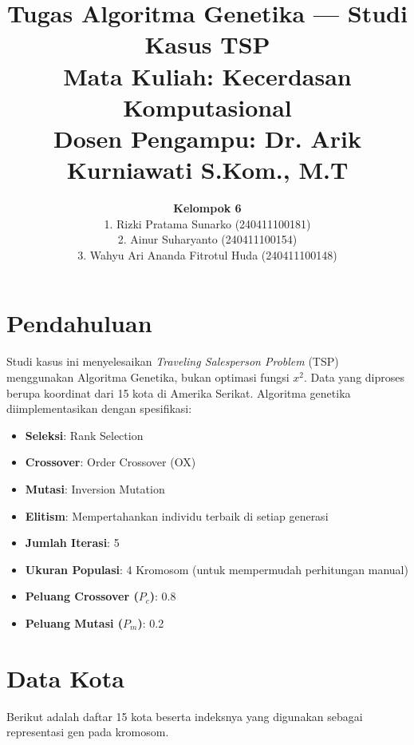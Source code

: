 \documentclass[12pt]{article}
\title{
  \textbf{Tugas Algoritma Genetika --- Studi Kasus TSP} \\
  \vspace{0.5em}
  \large \textbf{Mata Kuliah:} Kecerdasan Komputasional \\
  \large \textbf{Dosen Pengampu:} Dr. Arik Kurniawati S.Kom., M.T
}
\author{
  \textbf{Kelompok 6} \\
  1. Rizki Pratama Sunarko (240411100181) \\
  2. Ainur Suharyanto (240411100154)\\
  3. Wahyu Ari Ananda Fitrotul Huda (240411100148)\\
}
\date{}
\begin{document}
\maketitle
\vspace{5em}
\section{Pendahuluan}
Studi kasus ini menyelesaikan \textit{Traveling Salesperson Problem} (TSP) menggunakan Algoritma Genetika, bukan optimasi fungsi $x^2$. Data yang diproses berupa koordinat dari 15 kota di Amerika Serikat. Algoritma genetika diimplementasikan dengan spesifikasi:

\begin{itemize}
    \item \textbf{Seleksi}: Rank Selection
    \item \textbf{Crossover}: Order Crossover (OX)
    \item \textbf{Mutasi}: Inversion Mutation
    \item \textbf{Elitism}: Mempertahankan individu terbaik di setiap generasi
    \item \textbf{Jumlah Iterasi}: 5
    \item \textbf{Ukuran Populasi}: 4 Kromosom (untuk mempermudah perhitungan manual)
    \item \textbf{Peluang Crossover ($P_c$)}: 0.8
    \item \textbf{Peluang Mutasi ($P_m$)}: 0.2
\end{itemize}
\vspace{15em}

\section{Data Kota}
Berikut adalah daftar 15 kota beserta indeksnya yang digunakan sebagai representasi gen pada kromosom.
\end{document}
